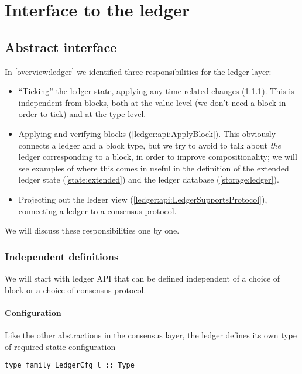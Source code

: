 \chapter{Interface to the ledger}
\label{ledger}

\section{Abstract interface}
\label{ledger:api}

In \cref{overview:ledger} we identified three responsibilities for the ledger
layer:
%
\begin{itemize}
\item ``Ticking'' the ledger state, applying any time related changes
(\cref{ledger:api:IsLedger}). This is independent from blocks, both at the value
level (we don't need a block in order to tick) and at the type level.
\item Applying and verifying blocks (\cref{ledger:api:ApplyBlock}). This
obviously connects a ledger and a block type, but we try to avoid to talk about
\emph{the} ledger corresponding to a block, in order to improve
compositionality; we will see examples of where this comes in useful in the
definition of the extended ledger state (\cref{state:extended}) and the ledger
database (\cref{storage:ledger}).
\item Projecting out the ledger view (\cref{ledger:api:LedgerSupportsProtocol}),
connecting a ledger to a consensus protocol.
\end{itemize}
%
We will discuss these responsibilities one by one.

\subsection{Independent definitions}
\label{ledger:api:IsLedger}

We will start with ledger API that can be defined independent of a choice of
block or a choice of consensus protocol.

\subsubsection{Configuration}

Like the other abstractions in the consensus layer, the ledger defines its own
type of required static configuration
%
\begin{lstlisting}
type family LedgerCfg l :: Type
\end{lstlisting}

